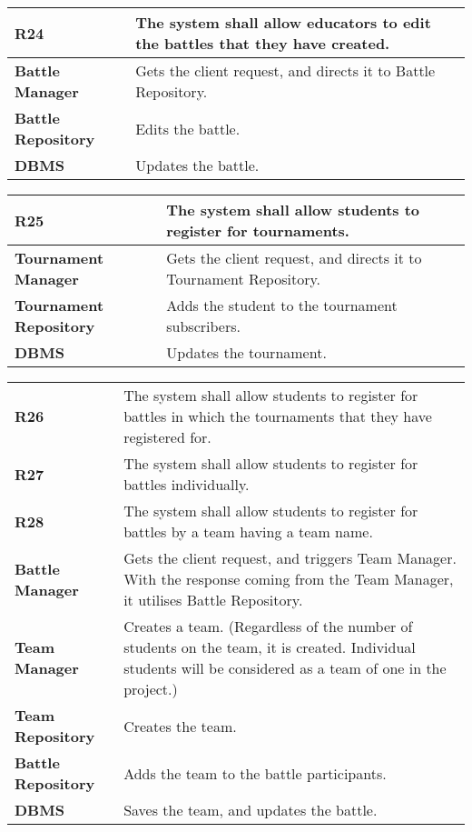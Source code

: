 \begin{table}[h!]
  \centering
  \begin{tabular}{lp{12cm}}
    \hline
    \textbf{R24} & The system shall allow educators to edit the battles that they have created. \\
    \hline
    \hline
     \textbf{Battle Manager} & Gets the client request, and directs it to Battle Repository. \\
    \textbf{Battle Repository} & Edits the battle.\\
    \textbf{DBMS} & Updates the battle. \\
    \hline
  \end{tabular}
\end{table}

\begin{table}[h!]
  \centering
  \begin{tabular}{lp{12cm}}
    \hline
    \textbf{R25} &  The system shall allow students to register for tournaments. \\
    \hline
    \hline
     \textbf{Tournament Manager} & Gets the client request, and directs it to Tournament Repository. \\
    \textbf{Tournament Repository} & Adds the student to the tournament subscribers.\\
    \textbf{DBMS} & Updates the tournament. \\
    \hline
  \end{tabular}
\end{table}


\begin{table}[h!]
  \centering
  \begin{tabular}{lp{12cm}}
    \hline
    \textbf{R26} &  The system shall allow students to register for battles in which the tournaments that they have registered for.\\
    \textbf{R27} &  The system shall allow students to register for battles individually.\\
    \textbf{R28} &  The system shall allow students to register for battles by a team having a team name.\\
    \hline
    \hline
    \textbf{Battle Manager} & Gets the client request, and triggers Team Manager. With the response coming from the Team Manager, it utilises Battle Repository.\\
    \textbf{Team Manager} & Creates a team. (Regardless of the number of students on the team, it is created. Individual students will be considered as a team of one in the project.)\\
    \textbf{Team Repository} & Creates the team.\\
    \textbf{Battle Repository} & Adds the team to the battle participants.\\
    \textbf{DBMS} & Saves the team, and updates the battle. \\
    \hline
  \end{tabular}
\end{table}

